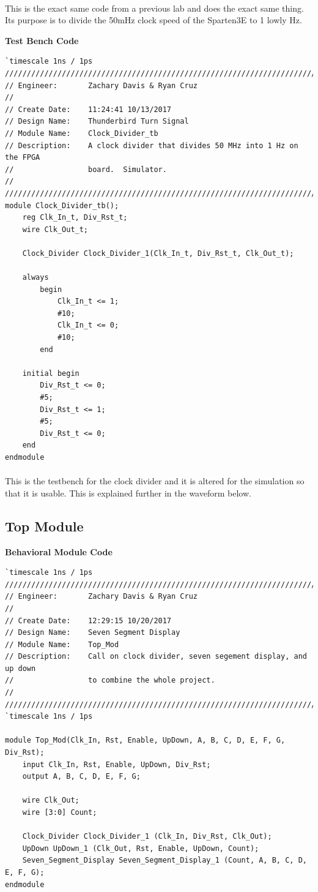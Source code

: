 \documentclass[12pt]{report}
\begin{document}
		\paragraph*{}
			This is the exact same code from a previous lab and does the exact same thing.  Its 
			purpose is to divide the 50mHz clock speed of the Sparten3E to 1 lowly Hz.
		\vspace{1cm}

	\newpage	
	\textbf{Test Bench Code}

		\begin{Verbatim}[frame=single, fontsize=\small]
`timescale 1ns / 1ps
////////////////////////////////////////////////////////////////////////////////
// Engineer:       Zachary Davis & Ryan Cruz
// 
// Create Date:    11:24:41 10/13/2017 
// Design Name:    Thunderbird Turn Signal
// Module Name:    Clock_Divider_tb 
// Description:    A clock divider that divides 50 MHz into 1 Hz on the FPGA
//                 board.  Simulator.
//
////////////////////////////////////////////////////////////////////////////////
module Clock_Divider_tb();
	reg Clk_In_t, Div_Rst_t;
	wire Clk_Out_t;
	
	Clock_Divider Clock_Divider_1(Clk_In_t, Div_Rst_t, Clk_Out_t);
	
	always
		begin
			Clk_In_t <= 1;
			#10;
			Clk_In_t <= 0;
			#10;
		end
	
	initial begin
		Div_Rst_t <= 0;
		#5;
		Div_Rst_t <= 1;
		#5;
		Div_Rst_t <= 0;
	end
endmodule
		\end{Verbatim}
		\paragraph*{}
			This is the testbench for the clock divider and it is altered for the simulation so 
			that it is usable.  This is explained further in the waveform below.

\newpage
\subsection*{Top Module}
	\textbf{Behavioral Module Code}

		\begin{Verbatim}[frame=single, fontsize=\small]
`timescale 1ns / 1ps
////////////////////////////////////////////////////////////////////////////////
// Engineer:       Zachary Davis & Ryan Cruz
// 
// Create Date:    12:29:15 10/20/2017 
// Design Name:    Seven Segment Display
// Module Name:    Top_Mod 
// Description:    Call on clock divider, seven segement display, and up down
//                 to combine the whole project.
//
////////////////////////////////////////////////////////////////////////////////
`timescale 1ns / 1ps

module Top_Mod(Clk_In, Rst, Enable, UpDown, A, B, C, D, E, F, G, Div_Rst);
	input Clk_In, Rst, Enable, UpDown, Div_Rst;
	output A, B, C, D, E, F, G;
	
	wire Clk_Out;
	wire [3:0] Count;

	Clock_Divider Clock_Divider_1 (Clk_In, Div_Rst, Clk_Out);
	UpDown UpDown_1 (Clk_Out, Rst, Enable, UpDown, Count);
	Seven_Segment_Display Seven_Segment_Display_1 (Count, A, B, C, D, E, F, G);
endmodule
		\end{Verbatim}
\end{document}
